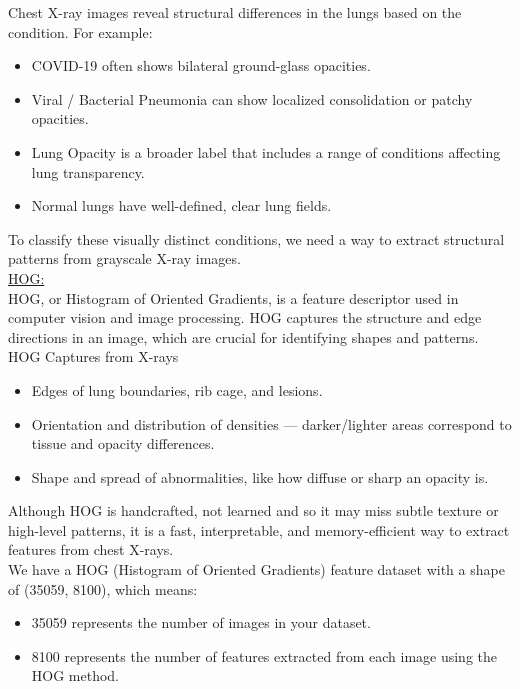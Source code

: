\documentclass{article}
\begin{document}
Chest X-ray images reveal structural differences in the lungs based on the condition. For example:
\begin{itemize}
    \item COVID-19 often shows bilateral ground-glass opacities.
    \item Viral / Bacterial Pneumonia can show localized consolidation or patchy opacities.
    \item Lung Opacity is a broader label that includes a range of conditions affecting lung transparency.
    \item Normal lungs have well-defined, clear lung fields.
\end{itemize}

\vspace{0.5cm}

To classify these visually distinct conditions, we need a way to extract structural patterns from grayscale X-ray images.\\

\noindent \underline{HOG:}
\vspace{0.5cm}\\
HOG, or Histogram of Oriented Gradients, is a feature descriptor used in computer vision and image processing.  
HOG captures the structure and edge directions in an image, which are crucial for identifying shapes and patterns.
\\

HOG Captures from X-rays

\begin{itemize}
     \item Edges of lung boundaries, rib cage, and lesions.
     \item Orientation and distribution of densities — darker/lighter areas correspond to tissue and opacity differences.
     \item Shape and spread of abnormalities, like how diffuse or sharp an opacity is.
\end{itemize}
Although HOG is handcrafted, not learned  and  so it may miss subtle texture or high-level patterns, it is a fast, interpretable, and memory-efficient way to 
extract features from chest X-rays. \\
We have a HOG (Histogram of Oriented Gradients) feature dataset with a shape of (35059, 8100), which means:
\begin{itemize}
    \item 35059 represents the number of images in your dataset.
    \item 8100 represents the number of features extracted from each image using the HOG method.
\end{itemize}
	
\end{document}
